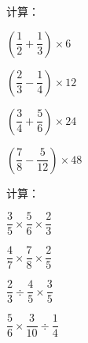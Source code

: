 \documentclass[a4paper,12pt]{ctexart}
\begin{document}
\begin{exercise}
\item 计算：
  \begin{subexercise}
    \item $\left(\dfrac{1}{2}+\dfrac{1}{3}\right)\times6$
    \item $\left(\dfrac{2}{3}-\dfrac{1}{4}\right)\times12$
    \item $\left(\dfrac{3}{4}+\dfrac{5}{6}\right)\times24$
    \item $\left(\dfrac{7}{8}-\dfrac{5}{12}\right)\times48$
  \end{subexercise}

\item 计算：
  \begin{subexercise}
    \item $\dfrac{3}{5}\times\dfrac{5}{6}\times\dfrac{2}{3}$
    \item $\dfrac{4}{7}\times\dfrac{7}{8}\times\dfrac{2}{5}$
    \item $\dfrac{2}{3}\div\dfrac{4}{5}\times\dfrac{3}{5}$
    \item $\dfrac{5}{6}\times\dfrac{3}{10}\div\dfrac{1}{4}$
  \end{subexercise}
\end{exercise}

\newpage



\bigskip
\end{document}
